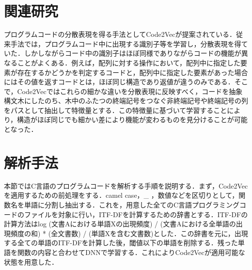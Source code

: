 \documentclass[submit,techrep,noauthor]{ipsj}
\begin{document}
\section{関連研究}

プログラムコードの分散表現を得る手法としてCode2Vec\cite{alon2019code2vec}が提案されている．従来手法では，プログラムコード中に出現する識別子等を学習し，分散表現を得ていた．しかしながらコード中の識別子はほぼ同様でありながらコードの機能が異なることがよくある．例えば，配列に対する操作において，配列中に指定した要素が存在するかどうかを判定するコードと，配列中に指定した要素があった場合にはその値を返すコードとは，ほぼ同じ構造であり返値が違うのみである．そこで，Code2Vecではこれらの細かな違いを分散表現に反映すべく，コードを抽象構文木にしたのち、木中のふたつの終端記号をつなぐ非終端記号や終端記号の列をパスとして抽出して特徴量とする．この特徴量に基づいて学習することにより，構造がほぼ同じでも細かい差により機能が変わるものを見分けることが可能となった．

\section{解析手法}

本節ではC言語のプログラムコードを解析する手順を説明する．まず，Code2Vecを適用するための前処理をする．camel case，\_ ，数値などを区切りとして，関数名を単語に分割し抽出する．これを，用意した全てのC言語プログラミングコードのファイルを対象に行い，ITF-DFを計算するための辞書とする．ITF-DFの計算方法は{log (文書Aにおける単語Xの出現頻度) / (文書Aにおける全単語の出現頻度の和)} * {(全文書数) / (単語Xを含む文書数)}とした．この辞書を元に，出現する全ての単語のITF-DFを計算した後，閾値以下の単語を削除する．残った単語を関数の内容と合わせてDNNで学習する．これによりCode2Vecが適用可能な状態を用意した．


\end{document}
